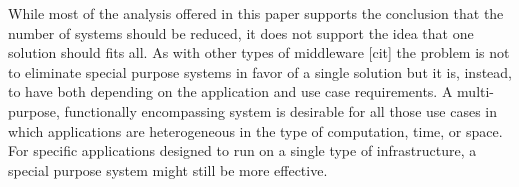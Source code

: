 \documentclass{sig-alternate}
\begin{document}

While most of the analysis offered in this paper supports the conclusion that
the number of \pilot systems should be reduced, it does not support the idea
that one solution should fits all. As with other types of middleware [cit] the
problem is not to eliminate special purpose systems in favor of a single
solution but it is, instead, to have both depending on the application and use
case requirements. A multi-purpose, functionally encompassing \pilot system is
desirable for all those use cases in which applications are heterogeneous in
the type of computation, time, or space. For specific applications designed to
run on a single type of infrastructure, a special purpose system might still be
more effective.


\end{document}
